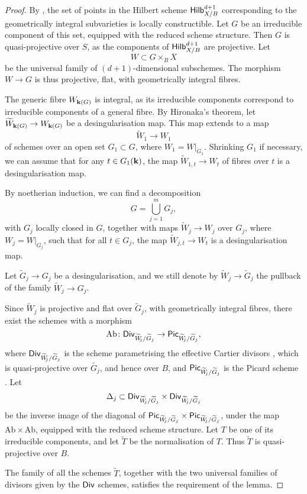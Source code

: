 \begin{proof}
    \def\WjGj{\widetilde{W}\mkern-6mu_j/\widetilde{G}_j}
    By \cite[Theorem~9.7.7]{EGA4-3}, the set of points in the Hilbert scheme $\textsf{\textup{Hilb}}_{X/B}^{d+1}$
    corresponding to the geometrically integral subvarieties is locally constructible.
    Let $G$ be an irreducible component of this set, equipped with the reduced scheme structure.
    Then $G$ is quasi-projective over $S$, as the components of $\textsf{\textup{Hilb}}_{X/B}^{d+1}$ are projective. Let
    \[ W \subset G \times_B X \]
    be the universal family of $(d+1)$-dimensional subschemes.
    The morphism $W \to G$ is thus projective, flat, with geometrically integral fibres.

    The generic fibre $W_{\bbk(G)}$ is integral, 
    as its irreducible components correspond to irreducible components of a general fibre.
    By Hironaka's theorem, let $\widetilde{W}_{\bbk(G)} \to W_{\bbk(G)}$ be a desingularisation map. 
    This map extends to a map
    \[ \widetilde{W}_1 \to W_1 \]
    of schemes over an open set $G_1 \subset G$, where $W_1 = W|_{G_1}$.
    Shrinking $G_1$ if necessary, we can assume that for any $t \in G_1(\bbk)$, 
    the map $\widetilde{W}_{1,t} \to W_t$ of fibres over $t$ is a desingularisation map.
    
    By noetherian induction, we can find a decomposition
    \[ \textstyle G = \bigcup_{j=1}^m G_j, \]
    with $G_j$ locally closed in $G$, together with
    maps $\widetilde{W}_j \to W_j$ over $G_j$,
    where $W_j = W|_{G_j}$, such that for all $t \in G_j$,
    the map $\widetilde{W}_{j,t} \to W_t$ is a desingularisation map.

    Let $\widetilde{G}_j \to G_j$ be a desingularisation,
    and we still denote by $\widetilde{W}_j \to \widetilde{G}_j$
    the pullback of the family $\widetilde{W}_j \to G_j$.

    Since $\widetilde{W}_j$ is projective and flat over $\widetilde{G}_j$,
    with geometrically integral fibres, there exist the schemes with a morphism
    \[ \mathrm{Ab} \: \sfname{Div}_{\WjGj} \to \sfname{Pic}_{\WjGj}, \]
    where $\sfname{Div}_{\WjGj}$ is the scheme parametrising the effective Cartier divisors
    \cite[Theorem~9.3.7]{FAG},
    which is quasi-projective over $\widetilde{G_j}$, and hence over $B$,
    and $\sfname{Pic}_{\WjGj}$ is the Picard scheme \cite[Theorem~9.4.8]{FAG}.
    Let
    \[ \Delta_j \subset \sfname{Div}_{\WjGj} \times \sfname{Div}_{\WjGj} \]
    be the inverse image of the diagonal of $\sfname{Pic}_{\WjGj} \times \sfname{Pic}_{\WjGj}$,
    under the map $\mathrm{Ab} \times \mathrm{Ab}$, equipped with the reduced scheme structure.
    Let $T$ be one of its irreducible components, and let $\widetilde{T}$ be the normalisation of $T$.
    Thus $\widetilde{T}$ is quasi-projective over $B$.

    The family of all the schemes $\widetilde{T}$, together with the two universal families of divisors
    given by the $\textsf{\textup{Div}}$ schemes, satisfies the requirement of the lemma.
\end{proof}


